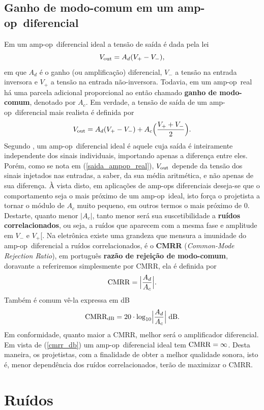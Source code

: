\documentclass[12pt, a4paper, leqno, twoside]{book}
\def\ampop{amp-op}
\def\db{{\rm dB}}
\def\cmrr{{\rm CMRR}}
\def\[{\begin{equation}}
\def\]{\end{equation}}
\begin{document}
  \subsection{Ganho de modo-comum em um \ampop\ diferencial}
  Em um \ampop\ diferencial ideal a tens\~ao de sa\'ida \'e dada pela lei
  \[
    V_{\rm out}=A_d(V_+-V_-),
  \]
  em que $A_d$ \'e o ganho (ou amplifica\c c\~ao) diferencial, $V_-$ a tens\~ao na entrada inversora e $V_+$ a tens\~ao na entrada n\~ao-inversora. Todavia, em um \ampop\ real h\'a uma parcela adicional proporcional ao ent\~ao chamado {\bf ganho de modo-comum}, denotado por $A_c$. Em verdade, a tens\~ao de sa\'ida de um \ampop\ diferencial mais realista \'e definida por
  \[
    V_{\rm out}=A_d(V_+-V_-)+A_c\Bigl({V_++V_-\over 2}\Bigr).
    \label{saida_ampop_real}
  \]
  Segundo \cite{HH}, um \ampop\ diferencial ideal \'e aquele cuja sa\'ida \'e inteiramente independente dos sinais individuais, importando apenas a diferen\c ca entre eles. Por\'em, como se nota em (\ref{saida_ampop_real}), $V_{\rm out}$ depende da tens\~ao dos sinais injetados nas entradas, a saber, da sua m\'edia aritm\'etica, e n\~ao apenas de sua diferen\c ca. \`A vista disto, em aplica\c c\~oes de \ampop{s} diferenciais deseja-se que o comportamento seja o mais pr\'oximo de um \ampop\ ideal, isto for\c ca o projetista a tornar o m\'odulo de $A_c$ muito pequeno, em outros termos o mais pr\'oximo de 0. Destarte, quanto menor $|A_c|$, tanto menor ser\'a sua suscetibilidade a {\bf ru\'idos correlacionados}, ou seja, a ru\'idos que aparecem com a mesma fase e amplitude em $V_-$ e $V_+$[. Na eletr\^onica existe uma grandeza que mensura a imunidade do \ampop\ diferencial a ru\'idos correlacionados, \'e o {\bf CMRR} ({\it Common-Mode Rejection Ratio}\/), em portugu\^es {\bf raz\~ao de rejei\c c\~ao de modo-comum}, doravante a referiremos simplesmente por CMRR, ela \'e definida por
  \[
    \cmrr=\Bigl|{A_d\over A_c}\Bigr|.
  \]
  Tamb\'em \'e comum v\^e-la expressa em \db
  \[
    \cmrr_\db=20\cdot\log_{10}\Bigl|{A_d\over A_c}\Bigr|\;\db.
    \label{cmrr_db}
  \]
  Em conformidade, quanto maior a CMRR, melhor ser\'a o amplificador diferencial. Em vista de (\ref{cmrr_db}) um \ampop\ diferencial ideal tem $\cmrr=\infty$. Desta maneira, os projetistas, com a finalidade de obter a melhor qualidade sonora, isto \'e, menor depend\^encia dos ru\'idos correlacionados, ter\~ao de maximizar o CMRR. 
  \section{Ru\'idos}
\end{document}
